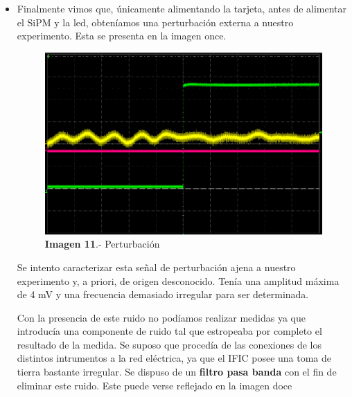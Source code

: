 \begin{itemize}
\newpage
\item {} Finalmente vimos que, únicamente alimentando la tarjeta, antes de alimentar el SiPM y la led, obteníamos una perturbación externa a nuestro experimento. Esta se presenta en la imagen once. 

\begin{figure}[hbtp]
\centering
\includegraphics[scale=0.2]{ruido.png}
\caption{\textbf{Imagen 11}.- Perturbación}
\end{figure}

Se intento caracterizar esta señal de perturbación ajena a nuestro experimento y, a priori, de origen desconocido. Tenía una amplitud máxima de 4 mV y una frecuencia demasiado irregular para ser determinada. 

Con la presencia de este ruido no podíamos realizar medidas ya que introducía una componente de ruido tal que estropeaba por completo el resultado de la medida. Se suposo que procedía de las conexiones de los distintos intrumentos a la red eléctrica, ya que el IFIC posee una toma de tierra bastante irregular. Se dispuso de un \textbf{filtro pasa banda} con el fin de eliminar este ruido. Este puede verse reflejado en la imagen doce


\end{itemize}
